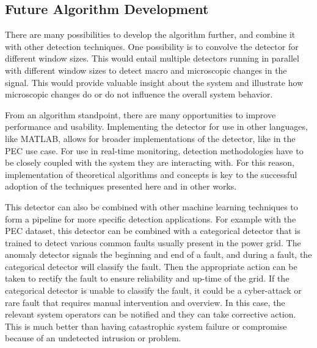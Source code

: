 \subsection{Future Algorithm Development}

There are many possibilities to develop the algorithm further, and combine it with other detection techniques. One possibility is to convolve the detector for different window sizes. This would entail multiple detectors running in parallel with different window sizes to detect macro and microscopic changes in the signal. This would provide valuable insight about the system and illustrate how microscopic changes do or do not influence the overall system behavior.

From an algorithm standpoint, there are many opportunities to improve performance and usability. Implementing the detector for use in other languages, like MATLAB, allows for broader implementations of the detector, like in the PEC use case. For use in real-time monitoring, detection methodologies have to be closely coupled with the system they are interacting with. For this reason, implementation of theoretical algorithms and concepts is key to the successful adoption of the techniques presented here and in other works.

This detector can also be combined with other machine learning techniques to form a pipeline for more specific detection applications. For example with the PEC dataset, this detector can be combined with a categorical detector that is trained to detect various common faults usually present in the power grid. The anomaly detector signals the beginning and end of a fault, and during a fault, the categorical detector will classify the fault. Then the appropriate action can be taken to rectify the fault to ensure reliability and up-time of the grid. If the categorical detector is unable to classify the fault, it could be a cyber-attack or rare fault that requires manual intervention and overview. In this case, the relevant system operators can be notified and they can take corrective action. This is much better than having catastrophic system failure or compromise because of an undetected intrusion or problem. 




